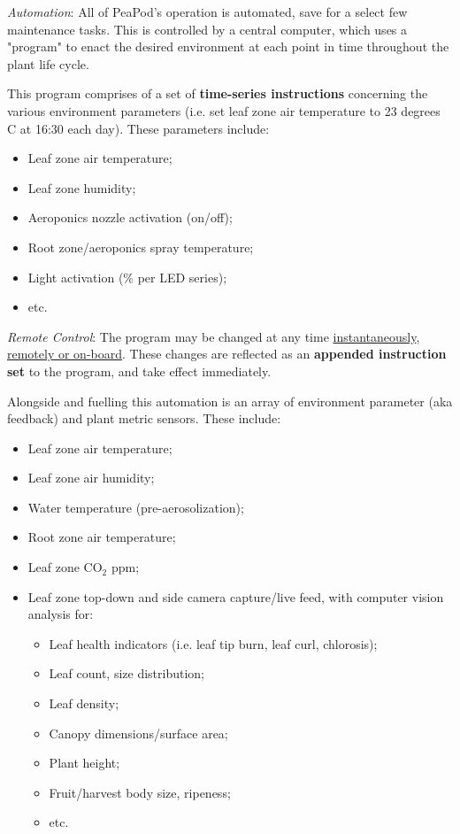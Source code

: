 \documentclass{report}
\begin{document}


\textit{Automation}: All of PeaPod's operation is automated, save for a select few maintenance tasks. This is controlled by a central computer, which uses a "program" to enact the desired environment at each point in time throughout the plant life cycle. 

This program comprises of a set of \textbf{time-series instructions} concerning the various environment parameters (i.e. set leaf zone air temperature to 23 degrees C at 16:30 each day). These parameters include:
\begin{itemize}
    \item Leaf zone air temperature;
    \item Leaf zone humidity;
    \item Aeroponics nozzle activation (on/off);
    \item Root zone/aeroponics spray temperature;
    \item Light activation (\% per LED series);
    \item etc.
\end{itemize}

\textit{Remote Control}: The program may be changed at any time \uline{instantaneously}, \uline{remotely or on-board}. These changes are reflected as an \textbf{appended instruction set} to the program, and take effect immediately. 

Alongside and fuelling this automation is an array of environment parameter (aka feedback) and plant metric sensors. These include:
\begin{itemize}
    \item Leaf zone air temperature;
    \item Leaf zone air humidity;
    \item Water temperature (pre-aerosolization);
    \item Root zone air temperature;
    \item Leaf zone CO${}_2$ ppm;
    \item Leaf zone top-down and side camera capture/live feed, with computer vision analysis for:
    \begin{itemize}
        \item Leaf health indicators (i.e. leaf tip burn, leaf curl, chlorosis);
        \item Leaf count, size distribution;
        \item Leaf density;
        \item Canopy dimensions/surface area;
        \item Plant height;
        \item Fruit/harvest body size, ripeness;
        \item etc.
    \end{itemize}
\end{itemize}
\end{document}
